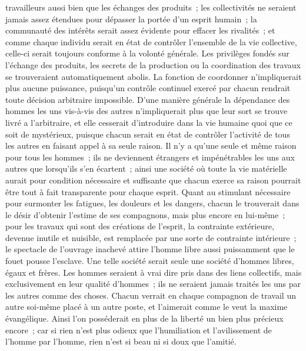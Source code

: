 \documentclass[french,twoside]{book} %
\begin{document}
travailleurs aussi bien que les échanges des produits ; les collectivités ne seraient jamais assez étendues pour dépasser la portée d'un esprit humain ; la communauté des intérêts serait assez évidente pour effacer les rivalités ; et comme chaque individu serait en état de contrôler l'ensemble de la vie collective, celle-ci serait toujours conforme à la volonté générale. Les privilèges fondés sur l'échange des produits, les secrets de la production ou la coordination des travaux se trouveraient automatiquement abolis. La fonction de coordonner n'impliquerait plus aucune puissance, puisqu'un contrôle continuel exercé par chacun rendrait toute décision arbitraire impossible. D'une manière générale la dépendance des hommes les uns vis-à-vis des autres n'impliquerait plus que leur sort se trouve livré a l'arbitraire, et elle cesserait d'introduire dans la vie humaine quoi que ce soit de mystérieux, puisque chacun serait en état de contrôler l'activité de tous les autres en faisant appel à sa seule raison. Il n'y a qu’une seule et même raison pour tous les hommes ; ils ne deviennent étrangers et impénétrables les uns aux autres que lorsqu'ils s'en écartent ; ainsi une société où toute la vie matérielle aurait pour condition nécessaire et suffisante que chacun exerce sa raison pourrait être tout à fait transparente pour chaque esprit. Quant au stimulant nécessaire pour surmonter les fatigues, les douleurs et les dangers, chacun le trouverait dans le désir d'obtenir l'estime de ses compagnons, mais plus encore en lui-même ; pour les travaux qui sont des créations de l'esprit, la contrainte extérieure, devenue inutile et nuisible, est remplacée par une sorte de contrainte intérieure ; le spectacle de l'ouvrage inachevé attire l'homme libre aussi puissamment que le fouet pousse l'esclave. Une telle société serait seule une société d'hommes libres, égaux et frères. Les hommes seraient à vrai dire pris dans des liens collectifs, mais exclusivement en leur qualité d'hommes ; ils ne seraient jamais traités les uns par les autres comme des choses. Chacun verrait en chaque compagnon de travail un autre soi-même placé à un autre poste, et l'aimerait comme le veut la maxime évangélique. Ainsi l'on posséderait en plus de la liberté un bien plus précieux encore ; car si rien n'est plus odieux que l'humiliation et l'avilissement de l'homme par l'homme, rien n'est si beau ni si doux que l'amitié.\par
\end{document}
